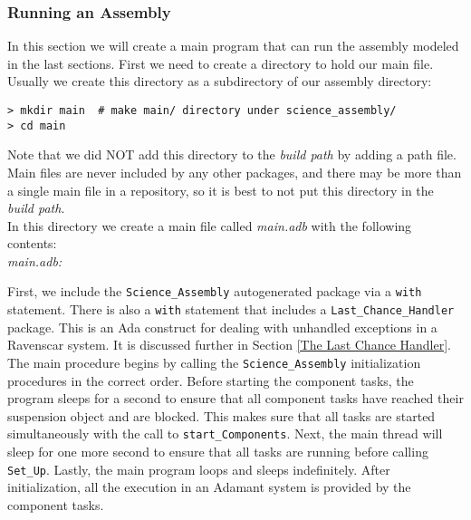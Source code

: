 \subsubsection{Running an Assembly} \label{Running an Assembly}

In this section we will create a main program that can run the assembly modeled in the last sections. First we need to create a directory to hold our main file. Usually we create this directory as a subdirectory of our assembly directory:

\vspace{5mm} %
\begin{verbatim}
> mkdir main  # make main/ directory under science_assembly/
> cd main 
\end{verbatim}
\vspace{5mm} %

Note that we did NOT add this directory to the \textit{build path} by adding a path file. Main files are never included by any other packages, and there may be more than a single main file in a repository, so it is best to not put this directory in the \textit{build path}. \\

In this directory we create a main file called \textit{main.adb} with the following contents: \\

\textit{main.adb:}

First, we include the \texttt{Science\_Assembly} autogenerated package via a \texttt{with} statement. There is also a \texttt{with} statement that includes a \texttt{Last\_Chance\_Handler} package. This is an Ada construct for dealing with unhandled exceptions in a Ravenscar system. It is discussed further in Section \ref{The Last Chance Handler}. \\

The main procedure begins by calling the \texttt{Science\_Assembly} initialization procedures in the correct order. Before starting the component tasks, the program sleeps for a second to ensure that all component tasks have reached their suspension object and are blocked. This makes sure that all tasks are started simultaneously with the call to \texttt{start\_Components}. Next, the main thread will sleep for one more second to ensure that all tasks are running before calling \texttt{Set\_Up}. Lastly, the main program loops and sleeps indefinitely. After initialization, all the execution in an Adamant system is provided by the component tasks. \\

